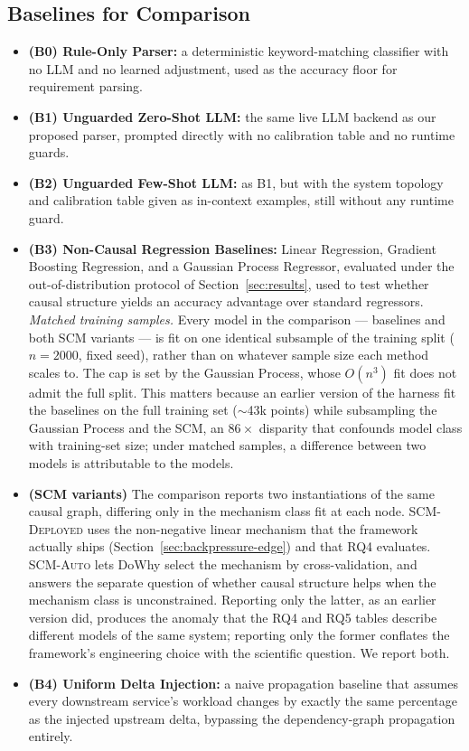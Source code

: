\documentclass[journal, 10pt]{IEEEtran}
\begin{document}
\subsection{Baselines for Comparison}
\begin{itemize}
    \item \textbf{(B0) Rule-Only Parser:} a deterministic keyword-matching classifier with no LLM and no learned adjustment, used as the accuracy floor for requirement parsing.
    \item \textbf{(B1) Unguarded Zero-Shot LLM:} the same live LLM backend as our proposed parser, prompted directly with no calibration table and no runtime guards.
    \item \textbf{(B2) Unguarded Few-Shot LLM:} as B1, but with the system topology and calibration table given as in-context examples, still without any runtime guard.
    \item \textbf{(B3) Non-Causal Regression Baselines:} Linear Regression, Gradient Boosting Regression, and a Gaussian Process Regressor, evaluated under the out-of-distribution protocol of Section~\ref{sec:results}, used to test whether causal structure yields an accuracy advantage over standard regressors. \emph{Matched training samples.} Every model in the comparison --- baselines and both SCM variants --- is fit on one identical subsample of the training split ($n{=}2000$, fixed seed), rather than on whatever sample size each method scales to. The cap is set by the Gaussian Process, whose $O(n^3)$ fit does not admit the full split. This matters because an earlier version of the harness fit the baselines on the full training set ($\sim$43k points) while subsampling the Gaussian Process and the SCM, an $86{\times}$ disparity that confounds model class with training-set size; under matched samples, a difference between two models is attributable to the models.
    \item \textbf{(SCM variants)} The comparison reports two instantiations of the same causal graph, differing only in the mechanism class fit at each node. \textsc{SCM-Deployed} uses the non-negative linear mechanism that the framework actually ships (Section~\ref{sec:backpressure-edge}) and that RQ4 evaluates. \textsc{SCM-Auto} lets DoWhy select the mechanism by cross-validation, and answers the separate question of whether causal structure helps when the mechanism class is unconstrained. Reporting only the latter, as an earlier version did, produces the anomaly that the RQ4 and RQ5 tables describe different models of the same system; reporting only the former conflates the framework's engineering choice with the scientific question. We report both.
    \item \textbf{(B4) Uniform Delta Injection:} a naive propagation baseline that assumes every downstream service's workload changes by exactly the same percentage as the injected upstream delta, bypassing the dependency-graph propagation entirely.
\end{itemize}
\end{document}
